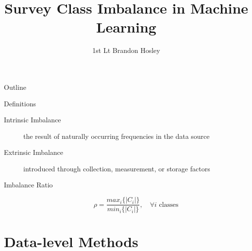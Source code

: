 \documentclass[xcolor={dvipsnames}]{beamer}
\title{Survey Class Imbalance in Machine Learning}
\author{1st Lt Brandon Hosley}
\begin{document}
\begin{frame}
    \maketitle
\end{frame}
\begin{frame}{Outline}
	\tableofcontents
\end{frame}

\begin{frame}{Definitions}
	\begin{description}
		\item[Intrinsic Imbalance] the result of naturally occurring frequencies in the data source
		\item[Extrinsic Imbalance] introduced through collection, measurement, or storage factors
		\item[Imbalance Ratio] $$\rho = \frac{max_i\{|C_i|\}}{min_i\{|C_i|\}}, \quad \forall i \text{ classes}$$
	\end{description}
\end{frame}


\section{Data-level Methods}
\end{document}
